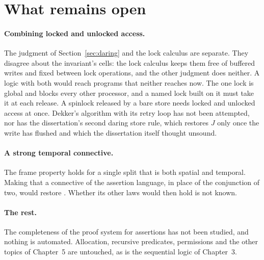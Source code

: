 \section{What remains open}
\label{sec:open}

\paragraph{Combining locked and unlocked access.}
The judgment of Section~\ref{sec:daring} and the lock calculus are
separate. They disagree about the invariant's cells: the lock calculus
keeps them free of buffered writes and fixed between lock operations, and
the other judgment does neither. A logic with both would reach programs
that neither reaches now. The one lock is global and blocks every other
processor, and a named lock built on it must take it at each release. A
spinlock released by a bare store needs locked and unlocked access at
once. Dekker's algorithm with its retry loop has not been attempted, nor
has the dissertation's second daring store rule, which restores $J$ only
once the write has flushed and which the dissertation itself thought
unsound.

\paragraph{A strong temporal connective.}
The frame property holds for a single split that is both spatial and
temporal. Making that a connective of the assertion language, in place of
the conjunction of two, would restore . Whether its other
laws would then hold is not known.

\paragraph{The rest.}
The completeness of the proof system for assertions has not been studied,
and nothing is automated. Allocation, recursive predicates, permissions
and the other topics of Chapter~5 are untouched, as is the sequential
logic of Chapter~3.
